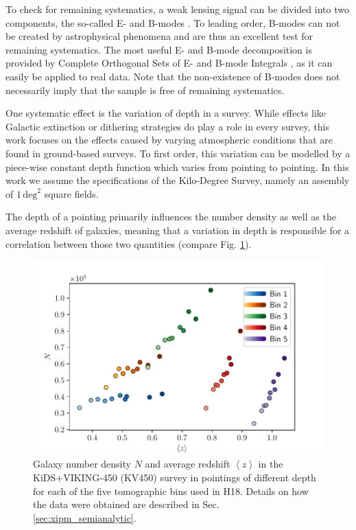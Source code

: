 \documentclass[referee]{aa} %
\renewcommand{\[}{\begin{equation}}
\renewcommand{\]}{\end{equation}}
\def\la{\left<}
\def\ra{\right>}
\begin{document}
To check for remaining systematics, a weak lensing signal can be divided into two components, the so-called E- and B-modes \citep{2002ApJ...568...20C,2002A&A...389..729S}. To leading order, B-modes can not be created by astrophysical phenomena and are thus an excellent test for remaining systematics. The most useful E- and B-mode decomposition is provided by Complete Orthogonal Sets of E- and B-mode Integrals \citep[COSEBIs, compare][]{2010A&A...520A.116S}, as it can easily be applied to real data. Note that the non-existence of B-modes does not necessarily imply that the sample is free of remaining systematics.

One systematic effect is the variation of depth in a survey. While effects like Galactic extinction or dithering strategies do play a role in every survey, this work focuses on the effects caused by varying atmospheric conditions that are found in ground-based surveys. To first order, this variation can be modelled by a piece-wise constant depth function which varies from pointing to pointing. In this work we assume the specifications of the Kilo-Degree Survey, namely an assembly of $1\,\text{deg}^2$ square fields. 

The depth of a pointing primarily influences the number density as well as the average redshift of galaxies, meaning that a variation in depth is responsible for a correlation between those two quantities (compare Fig. \ref{fig:nz_of_meanz}).

\begin{figure}
\centering
\includegraphics[width=0.7\linewidth]{images/cov_nz_meanz.pdf}
\caption{Galaxy number density $N$ and average redshift $\la z\ra$ in the KiDS+VIKING-450 (KV450) survey \citep{Wright:2018} in pointings of different depth for each of the five tomographic bins used in H18. Details on how the data were obtained are described in Sec. \ref{sec:xipm_semianalytic}.}
\label{fig:nz_of_meanz}
\end{figure}
\end{document}
